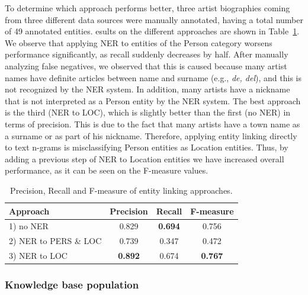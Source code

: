 To determine which approach performs better, three artist biographies coming from three different data sources were manually annotated, having a total number of 49 annotated entities. %
esults on the different approaches are shown in Table~\ref{tbl:musicology:res1}. We observe that applying NER to entities of the Person category worsens performance significantly, as recall suddenly decreases by half. After manually analyzing false negatives, we observed that this is caused because many artist names have definite articles between name and surname (e.g., \textit{de, del}), and this is not recognized by the NER system. In addition, many artists have a nickname that is not interpreted as a Person entity by the NER system. The best approach is the third (NER to LOC), which is slightly better than the first (no NER) in terms of precision. This is due to the fact that many artists have a town name as a surname or as part of his nickname. Therefore, applying entity linking directly to text n-grams is misclassifying Person entities as Location entities. Thus, by adding a previous step of NER to Location entities we have increased overall performance, as it can be seen on the F-measure values.

\begin{table}
	\centering
	  \begin{tabular}{  l c c c }
    \hline
    Approach & Precision & Recall & F-measure \\ 
    \hline
    1) no NER & 0.829 & \textbf{0.694} & 0.756 \\ 
    2) NER to PERS \& LOC & 0.739 & 0.347 & 0.472 \\
    3) NER to LOC & \textbf{0.892} & 0.674 & \textbf{0.767} \\
    \hline
  \end{tabular}
	\caption{Precision, Recall and F-measure of entity linking approaches.}
	
	\label{tbl:musicology:res1}
\end{table}

\subsubsection{Knowledge base population}
\label{sec:musicology:ie}

